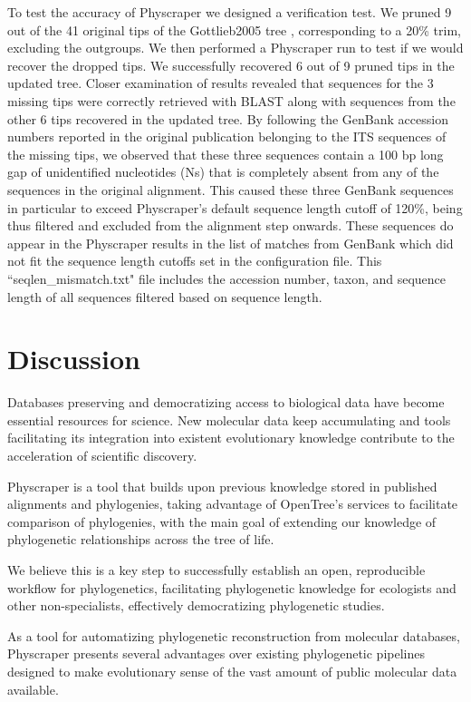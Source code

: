 \documentclass{bmcart}
\begin{document}
To test the accuracy of Physcraper we designed a verification test.
We pruned 9 out of the 41 original tips of the Gottlieb2005 tree \cite{gottlieb2005molecular},
corresponding to a 20\% trim, excluding the outgroups. We then performed a Physcraper
run to test if we would recover the dropped tips.
We successfully recovered 6 out of 9 pruned tips in the updated tree.
Closer examination of results revealed that sequences for the 3 missing tips were correctly retrieved
with BLAST along with sequences from the other 6 tips recovered in the updated tree.
By following the GenBank accession numbers reported in the original publication
belonging to the ITS sequences of the missing tips, we observed that these three sequences
contain a 100 bp long gap of unidentified nucleotides (Ns) that is completely absent
from any of the sequences in the original alignment. This caused these three GenBank sequences
in particular to exceed Physcraper's default sequence length cutoff of 120\%, being thus
filtered and excluded from the alignment step onwards.
These sequences do appear in the Physcraper results in the list of matches from
GenBank which did not fit the sequence length cutoffs set in the configuration file.
This ``seqlen\_mismatch.txt" file includes the accession number, taxon, and sequence
length of all sequences filtered based on sequence length.


\section*{Discussion}
Databases preserving and democratizing access to biological data
have become essential resources for science.
New molecular data keep accumulating and tools facilitating its integration into
existent evolutionary knowledge contribute to the acceleration of scientific discovery.

Physcraper is a tool that builds upon previous knowledge stored in published
alignments and phylogenies, taking advantage of OpenTree's services to facilitate comparison
of phylogenies, with the main goal of extending our knowledge of phylogenetic relationships
across the tree of life.

We believe this is a key step to successfully establish an open, reproducible workflow for phylogenetics,
facilitating phylogenetic knowledge for ecologists and other non-specialists, effectively
democratizing phylogenetic studies.

As a tool for automatizing phylogenetic reconstruction from molecular databases,
Physcraper presents several advantages over existing phylogenetic pipelines designed to
make evolutionary sense of the vast amount of
public molecular data available.
\end{document}
